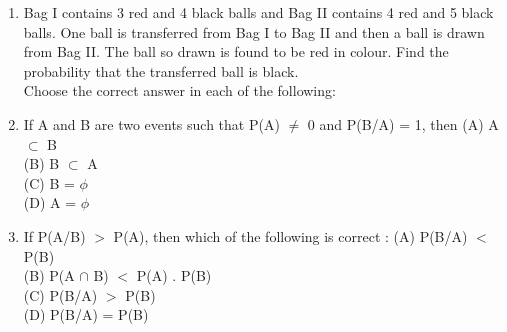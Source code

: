 \begin{enumerate}[label=\arabic*.,ref=\thesubsection.\theenumi]
\item Bag I contains 3 red and 4 black balls and Bag II contains 4 red and 5 black balls. One ball is transferred from Bag I to Bag II and then a ball is drawn from Bag II. The ball so drawn is found to be red in colour. Find the probability that the transferred ball is black.\\

 Choose the correct answer in each of the following:
\item If A and B are two events such that P(A) $\neq$ 0 and P(B/A) = 1, then
(A) A $\subset$ B \\
(B) B $\subset$ A \\
(C) B = $\phi$ \\
(D) A = $\phi$\\

\item If P(A/B) $>$ P(A), then which of the following is correct :
(A) P(B/A) $<$ P(B) \\
(B) P(A $\cap$ B) $<$ P(A) . P(B)\\
(C) P(B/A) $>$ P(B) \\
(D) P(B/A) = P(B)


\end{enumerate}
